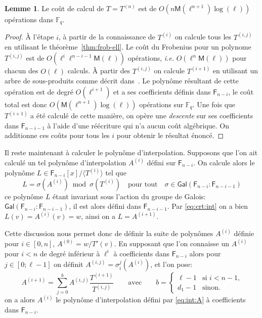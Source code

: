 \documentclass[10pt,a4paper]{book}
\theoremstyle{plain}
\theoremstyle{definition}
\newtheorem{lem}[thm]{Lemme}
\theoremstyle{definition}
\theoremstyle{definition}
\theoremstyle{definition}
\theoremstyle{remark}
\theoremstyle{remark}
\theoremstyle{definition}
\begin{document}
\begin{lem}\label{lemma:interpolation:minpoly}
  Le coût de calcul de $T=T^{(n)}$ est de $O(n\mathsf{M}(\ell^{n+1})\log(\ell))$
  opérations dans $\mathbb{F}_q$.
\end{lem}

\begin{proof}
  \`A l'étape $i$, à partir de la connaissance de $T^{(i)}$ on  calcule tous 
  les $T^{(i,j)}$ en utilisant le théorème~\ref{thm:frob-ell}. Le coût du 
  Frobenius pour un polynome $T^{(i,j)}$ est de 
  $O(\ell^i\ell^{n-i-1}\mathsf{M}(\ell))$ opérations,
  \emph{i.e.} $O(\ell^n\mathsf{M}(\ell))$ pour chacun des $O(\ell)$ calculs.
  \`A partir des $T^{(i,j)}$ on calcule $T^{(i+1)}$ en utilisant un arbre de 
  sous-produits comme décrit dans~\cite[Lemma~10.4]{vzGJG03}. Le polynôme 
  résultant de cette opération est de degré $O(\ell^{i+1})$ et a ses 
  coefficients définis dans $\mathsf{F}_{n-i}$, le coût total est donc 
  $O(\mathsf{M}(\ell^{n+1})\log(\ell))$ opérations sur $\mathbb{F}_q$. Une fois
   que $T^{(i+1)}$ a été calculé de cette manière, on opère une \emph{descente}
  sur ses coefficients dans $\mathsf{F}_{n-i-1}$ à l'aide d'une réécriture 
  qui n'a aucun coût algébrique.
  On additionne ces coûts pour tous les $i$ pour obtenir le résultat 
  énoncé. 
\end{proof}

Il reste maintenant à calculer le polynôme d'interpolation. Supposons que l'on 
ait calculé un tel polynôme d'interpolation $A^{(i)}$ défini sur 
$\mathsf{F}_{n-i}$. On calcule alors le polynôme $L \in \mathsf{F}_{n-i}[x]/ 
\langle T^{(i)} \rangle$ tel que 
\begin{equation}
\label{eq:crt:int}
L= \sigma(A^{(i)}) \bmod \sigma(T^{(i)}) \quad \text{pour tout} \quad \sigma \in 
\mathsf{Gal}(\mathsf{F}_{n-i}: \mathsf{F}_{n-i-1}) 
\end{equation} 
ce polynôme $L$ étant invariant sous l'action du groupe de Galois: 
$\mathsf{Gal}(\mathsf{F}_{n-i}: \mathsf{F}_{n-i-1})$, il est alors défini dans
 $\mathsf{F}_{n-i-1}$. Par \ref{eq:crt:int} on a bien $L(v)=A^{(i)}(v)=w$, 
 ainsi on a $L=A^{(i+1)}$. 
 
 Cette discussion nous permet donc de définir la suite de polynômes $A^{(i)}$ 
 définie pour $i \in [0, n]$, $A^{(0)}=w/T'(v)$. En 
 supposant que l'on connaisse un $A^{(i)}$ pour $i < n$ de degré inférieur à $\ell^i$ à 
 coefficients dans $\mathsf{F}_{n-i}$ alors pour $j \in [0 ; \ell-1]$ on définit
 $A^{(i,j)}=\sigma_i^j(A^{(i)})$, et l'on pose:  
\begin{equation*}
A^{(i+1)}=\sum_{j=0}^{b}A^{(i,j)}\frac{T^{(i+1)}}{T^{(i,j)}} \qquad\text{avec}\qquad
  b = \begin{cases}
    \ell-1 &\text{si $i<n-1$,}\\
    d_1 -1 &\text{sinon.}
  \end{cases}
\end{equation*}
on a alors $A^{(i)}$ le polynôme d'interpolation défini par \ref{eq:int:A} 
à coefficients dans $\mathsf{F}_{n-i}$.
\end{document}
